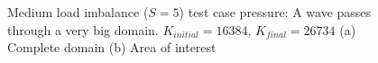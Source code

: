 \begin{figure}[H]
    \centering
    \hfill
    \caption{Medium load imbalance (\(S = 5\)) test case pressure: A wave passes through a very big domain. \(K_{initial} = 16384\), \(K_{final} = 26734\) (a) Complete domain (b) Area of interest}\label{fig:load_imbalance_case_medium_p}
\end{figure}

